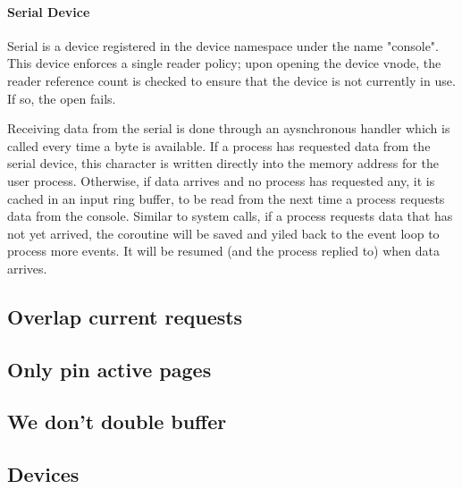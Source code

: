 \documentclass[runningheads,a4paper]{llncs}
\begin{document}
\paragraph{Serial Device}

Serial is a device registered in the device namespace under the name "console". This device enforces a single reader policy; upon opening the device vnode, the reader reference count is checked to ensure that the device is not currently in use. If so, the open fails.

Receiving data from the serial is done through an aysnchronous handler which is called every time a byte is available. If a process has requested data from the serial device, this character is written directly into the memory address for the user process. Otherwise, if data arrives and no process has requested any, it is cached in an input ring buffer, to be read from the next time a process requests data from the console. Similar to system calls, if a process requests data that has not yet arrived, the coroutine will be saved and yiled back to the event loop to process more events. It will be resumed (and the process replied to) when data arrives.

\subsection{Overlap current requests}

\subsection{Only pin active pages}

\subsection{We don't double buffer}

\subsection{Devices}

\medskip
\medskip
\end{document}
